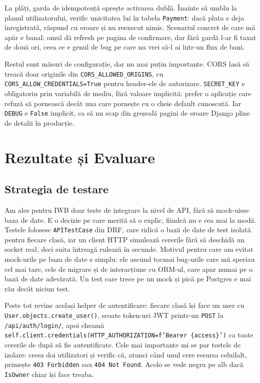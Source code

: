 \documentclass[12pt,a4paper]{report}
\begin{document}
La plăți, garda de idempotență oprește activarea dublă. Înainte să umblu la planul
utilizatorului, verific unicitatea lui  în tabela
\texttt{Payment}: dacă plata e deja înregistrată, răspund cu eroare și nu reexecut
nimic. Scenariul concret de care mă apăr e banal: omul dă refresh pe pagina de
confirmare, dar fără gardă l-ar fi taxat de două ori, ceea ce e genul de bug
pe care nu vrei să-l ai într-un flux de bani.

Restul sunt măsuri de configurație, dar nu mai puțin importante. CORS lasă să treacă
doar originile din \texttt{CORS\_ALLOWED\_ORIGINS}, cu
\texttt{CORS\_ALLOW\_CREDENTIALS=True} pentru header-ele de autorizare.
\texttt{SECRET\_KEY} e obligatoriu prin variabilă de mediu, fără valoare implicită:
prefer o aplicație care refuză să pornească decât una care pornește cu o cheie
default cunoscută. Iar \texttt{DEBUG} e \texttt{False} implicit, ca să nu scap din
greșeală pagini de eroare Django pline de detalii în producție.

\chapter{Rezultate și Evaluare}

\section{Strategia de testare}

Am ales pentru IWB doar teste de integrare la nivel de API, fără să mock-uiesc baza de
date. E o decizie pe care merită să o explic, fiindcă nu e cea mai la modă. Testele
folosesc \texttt{APITestCase} din DRF, care ridică o bază de date de test izolată
pentru fiecare clasă, iar un client HTTP simulează cererile fără să deschidă un socket
real, deci suita întreagă rulează în secunde. Motivul pentru care am evitat
mock-urile pe baza de date e simplu: ele ascund tocmai bug-urile care mă speriau cel mai
tare, cele de migrare și de interacțiune cu ORM-ul, care apar numai pe o bază de date
adevărată. Un test care trece pe un mock și pică pe Postgres e mai rău decât niciun
test.

Peste tot revine același helper de autentificare: fiecare clasă își face un user cu
\texttt{User.objects.create\_user()}, scoate token-uri JWT printr-un \texttt{POST} la
\texttt{/api/auth/login/}, apoi cheamă
\texttt{self.client.credentials(HTTP\_AUTHORIZATION=f'Bearer \{access\}')} ca toate
cererile de după să fie autentificate. Cele mai importante mi se par testele de
izolare: creez doi utilizatori și verific că, atunci când unul cere resursa celuilalt,
primește \texttt{403 Forbidden} sau \texttt{404 Not Found}. Acolo se vede negru pe alb
dacă \texttt{IsOwner} chiar își face treaba.
\end{document}
